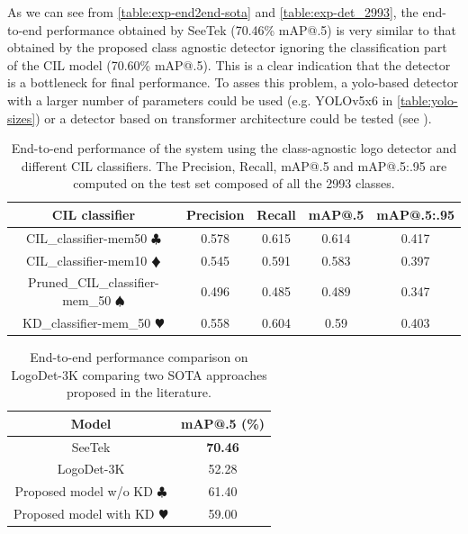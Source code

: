 As we can see from \autoref{table:exp-end2end-sota} and \autoref{table:exp-det_2993}, the end-to-end performance obtained by SeeTek (70.46\% mAP@.5) is very similar to that obtained by the proposed class agnostic detector ignoring the classification part of the CIL model (70.60\% mAP@.5). This is a clear indication that the detector is a bottleneck for final performance. To asses this problem, a yolo-based detector with a larger number of parameters could be used (e.g. YOLOv5x6 in \autoref{table:yolo-sizes}) or a detector based on transformer architecture could be tested (see \cite{carion2020end}).

\begin{table}[H]
    \centering
    \begin{tabular}{c|c|c|c|c}
        \hline
        \textbf{CIL classifier} &
        \textbf{Precision} &
        \textbf{Recall} &
        \textbf{mAP@.5} &
        \textbf{mAP@.5:.95} \\
        \hline
        \hline
CIL\_classifier-mem50 $\clubsuit$&0.578&0.615&0.614&0.417\\
CIL\_classifier-mem10 $\vardiamondsuit$&0.545&0.591&0.583&0.397\\
Pruned\_CIL\_classifier-mem\_50 $\spadesuit$&0.496&0.485&0.489&0.347\\
KD\_classifier-mem\_50 $\varheartsuit$&0.558&0.604&0.59&0.403\\
\hline
\end{tabular}
\caption{End-to-end performance of the system using the class-agnostic logo detector and different CIL classifiers. The Precision, Recall, mAP@.5 and mAP@.5:.95 are computed on the test set composed of all the 2993 classes.}
    \label{table:exp-end2end}
\end{table}


\begin{table}[H]
    \centering
    \begin{tabular}{c|c}
        \hline
        \textbf{Model} &
        \textbf{mAP@.5 (\%)}\\
        \hline
        \hline
SeeTek \cite{li2022seetek}&\textbf{70.46}\\
LogoDet-3K \cite{wang2022logodet}&52.28\\
\hline
Proposed model w/o KD $\clubsuit$&61.40\\
Proposed model with KD $\varheartsuit$&59.00\\
\hline
\end{tabular}
\caption{End-to-end performance comparison on LogoDet-3K comparing two SOTA approaches proposed in the literature.}
    \label{table:exp-end2end-sota}
\end{table}
